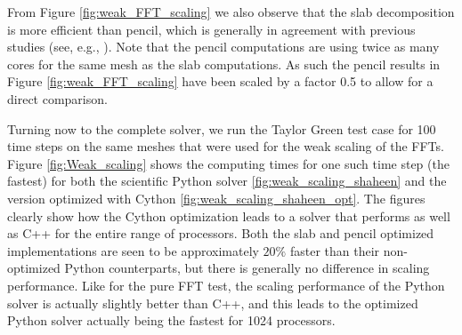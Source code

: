 \documentclass[final,3p,times,twocolumn]{elsarticle}
\begin{document}
From Figure \ref{fig:weak_FFT_scaling} we also observe that the slab 
decomposition is more efficient than pencil, which is generally in agreement 
with previous studies (see, e.g., \cite{pekurovsky2012}). Note that the pencil 
computations are using twice as many cores for the same mesh as the slab 
computations. As such the pencil results in Figure \ref{fig:weak_FFT_scaling} 
have been scaled by a factor 0.5 to allow for a direct comparison. 

Turning now to the complete solver, we run the Taylor Green test case for 100 
time steps on the same meshes that were used for the weak scaling of the FFTs. 
Figure \ref{fig:Weak_scaling} shows the computing times for one such time step 
(the fastest) for both the scientific Python solver 
\ref{fig:weak_scaling_shaheen} 
and the version optimized with Cython \ref{fig:weak_scaling_shaheen_opt}.
The figures clearly show how the Cython optimization leads to a solver that 
performs as well as C++ for the entire range of processors. Both the slab and 
pencil optimized implementations are seen to be approximately $20 \% $ faster 
than their non-optimized Python counterparts, but there is generally no 
difference in scaling performance. Like for the pure FFT test, the scaling 
performance of the Python solver is actually slightly better  than C++, and 
this leads to the optimized Python solver actually being the fastest for 1024 
processors.
\end{document}
